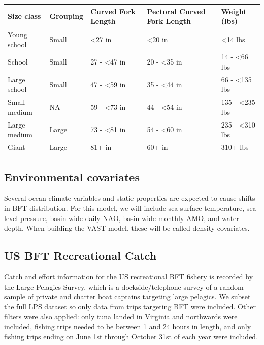 \documentclass[
]{article}
\let\origtable\table
\let\endorigtable\endtable
\renewenvironment{table}[1][2] {
    \expandafter\origtable\expandafter[H]
} {
    \endorigtable
}
\begin{document}
\begin{table}[H]

\caption{\label{tab:size-table}Table 1: Bluefin tuna size classes}
\centering
\begin{tabular}[t]{lllll}
\toprule
Size class & Grouping & Curved Fork
Length & Pectoral Curved
Fork Length & Weight (lbs)\\
\midrule
Young school & Small & <27 in & <20 in & <14 lbs\\
School & Small & 27 - <47 in & 20 - <35 in & 14 - <66 lbs\\
Large school & Small & 47 - <59 in & 35 - <44 in & 66 - <135 lbs\\
Small medium & NA & 59 - <73 in & 44 - <54 in & 135 - <235 lbs\\
Large medium & Large & 73 - <81 in & 54 - <60 in & 235 - <310 lbs\\
\addlinespace
Giant & Large & 81+ in & 60+ in & 310+ lbs\\
\bottomrule
\end{tabular}
\end{table}

\hypertarget{environmental-covariates}{%
\subsection{Environmental covariates}\label{environmental-covariates}}

Several ocean climate variables and static properties are expected to cause shifts in BFT distribution. For this model, we will include sea surface temperature, sea level pressure, basin-wide daily NAO, basin-wide monthly AMO, and water depth. When building the VAST model, these will be called density covariates.

\hypertarget{us-bft-recreational-catch}{%
\subsection{US BFT Recreational Catch}\label{us-bft-recreational-catch}}

Catch and effort information for the US recreational BFT fishery is recorded by the Large Pelagics Survey, which is a dockside/telephone survey of a random sample of private and charter boat captains targeting large pelagics. We subset the full LPS dataset so only data from trips targeting BFT were included. Other filters were also applied: only tuna landed in Virginia and northwards were included, fishing trips needed to be between 1 and 24 hours in length, and only fishing trips ending on June 1st through October 31st of each year were included.
\end{document}
